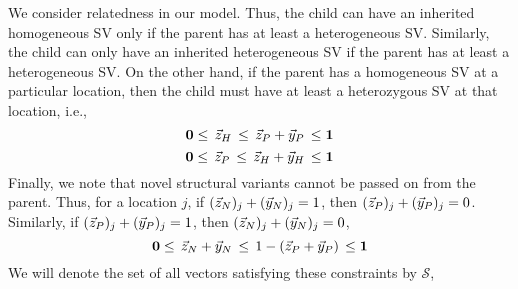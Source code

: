 We consider relatedness in our model. Thus, the child can have an inherited homogeneous SV only if the parent has at least a heterogeneous SV. Similarly, the child can only have an inherited heterogeneous SV if the parent has at least a heterogeneous SV. On the other hand, if the parent has a homogeneous SV at a particular location, then the child must have at least a heterozygous SV at that location, i.e.,
\begin{equation*}
	\mathbf{0} \leq \, \vec{z}_H   \, \leq \, \vec{z}_P + \vec{y}_P  \, \leq \mathbf{1}
\end{equation*}
\begin{equation*}
	\mathbf{0} \leq \, \vec{z}_P   \, \leq \, \vec{z}_H + \vec{y}_H  \, \leq \mathbf{1}
\end{equation*}
Finally, we note that novel structural variants cannot be passed on from the parent. Thus, for a location $j$, if $(\vec{z}_N)_j + (\vec{y}_N)_j =1$, then  $(\vec{z}_P)_j + (\vec{y}_P)_j =0$. Similarly, if $(\vec{z}_P)_j + (\vec{y}_P)_j  =1$, then  $(\vec{z}_N)_j + (\vec{y}_N)_j =0$,
\begin{equation*}
	\mathbf{0} \leq \, \vec{z}_N + \vec{y}_N   \, \leq \, 1- (\vec{z}_P +\vec{y}_P)  \, \leq \mathbf{1}
\end{equation*}
We will denote the set of all vectors satisfying these constraints by $\mathcal{S}$,
\renewcommand{\arraystretch}{1.3}
